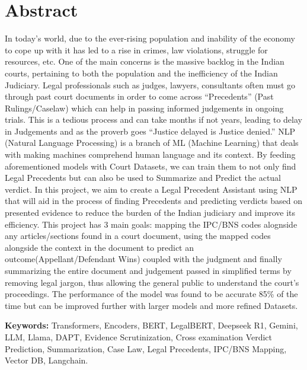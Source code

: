 \chapter*{Abstract}

In today’s world, due to the ever-rising population and inability of the economy to cope up with it has led to a rise in crimes, law violations, struggle for resources, etc. One of the main concerns is the massive backlog in the Indian courts, pertaining to both the population and the inefficiency of the Indian Judiciary. Legal professionals such as judges, lawyers, consultants often must go through past court documents in order to come across “Precedents” (Past Rulings/Caselaw) which can help in passing informed judgements in ongoing trials. This is a tedious process and can take months if not years, leading to delay in Judgements and as the proverb goes “Justice delayed is Justice denied.” 
NLP (Natural Language Processing) is a branch of ML (Machine Learning) that deals with making machines comprehend human language and its context. By feeding aforementioned models with Court Datasets, we can train them to not only find Legal Precedents but can also be used to Summarize and Predict the actual verdict. 
In this project, we aim to create a Legal Precedent Assistant using NLP that will aid in the process of finding Precedents and predicting verdicts based on presented evidence to reduce the burden of the Indian judiciary and improve its efficiency. This project has 3 main goals: mapping the IPC/BNS codes alognside any articles/sections found in a court document, using the mapped codes alongside the context in the document to predict an outcome(Appellant/Defendant Wins) coupled with the judgment and finally summarizing the entire document and judgement passed in simplified terms by removing legal jargon, thus allowing the general public to understand the court’s proceedings. The performance of the model was found to be accurate 85\% of the time but can be improved further with larger models and more refined Datasets.


\textbf{Keywords:} Transformers, Encoders, BERT, LegalBERT, Deepseek R1, Gemini, LLM, Llama, DAPT, Evidence Scrutinization, Cross examination Verdict Prediction, Summarization, Case Law, Legal Precedents, IPC/BNS Mapping, Vector DB, Langchain.
